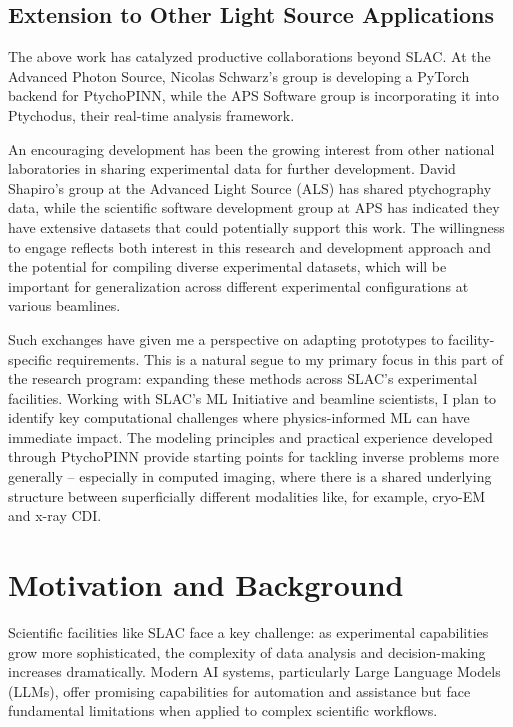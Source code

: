 \documentclass{article}
\begin{document}
\subsection{Extension to Other Light Source Applications}
The above work has catalyzed productive collaborations beyond SLAC. At the Advanced Photon Source, Nicolas Schwarz's group is developing a PyTorch backend for PtychoPINN, while the APS Software group is incorporating it into Ptychodus, their real-time analysis framework.

An encouraging development has been the growing interest from other national laboratories in sharing experimental data for further development. David Shapiro's group at the Advanced Light Source (ALS) has shared ptychography data, while the scientific software development group at APS has indicated they have extensive datasets that could potentially support this work. The willingness to engage reflects both interest in this research and development approach and the potential for compiling diverse experimental datasets, which will be important for generalization across different experimental configurations at various beamlines.

Such exchanges have given me a perspective on adapting prototypes to facility-specific requirements. This is a natural segue to my primary focus in this part of the research program: expanding these methods across SLAC's experimental facilities. Working with SLAC's ML Initiative and beamline scientists, I plan to identify key computational challenges where physics-informed ML can have immediate impact. The modeling principles and practical experience developed through PtychoPINN provide starting points for tackling inverse problems more generally -- especially in computed imaging, where there is a shared underlying structure between superficially different modalities like, for example, cryo-EM and x-ray CDI.

\section{Motivation and Background}
Scientific facilities like SLAC face a key challenge: as experimental capabilities grow more sophisticated, the complexity of data analysis and decision-making increases dramatically. Modern AI systems, particularly Large Language Models (LLMs), offer promising capabilities for automation and assistance but face fundamental limitations when applied to complex scientific workflows.
\end{document}
